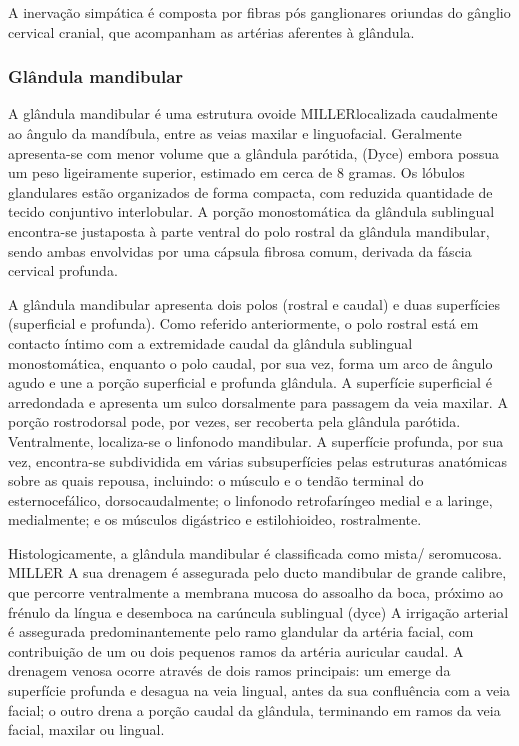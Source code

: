 A inervação simpática é composta por fibras pós ganglionares oriundas do gânglio cervical cranial, que acompanham as artérias aferentes à glândula.\cite{dyce}

\subsubsection{Glândula mandibular}

A glândula mandibular é uma estrutura ovoide MILLER\cite{dyce}localizada caudalmente ao ângulo da mandíbula, entre as veias maxilar e linguofacial. Geralmente apresenta-se com menor volume que a glândula parótida, (Dyce) embora possua um peso ligeiramente superior, estimado em cerca de 8 gramas. Os lóbulos glandulares estão organizados de forma compacta, com reduzida quantidade de tecido conjuntivo interlobular. A porção monostomática da glândula sublingual encontra-se justaposta à parte ventral do polo rostral da glândula mandibular, sendo ambas envolvidas por uma cápsula fibrosa comum, derivada da fáscia cervical profunda.


A glândula mandibular apresenta dois polos (rostral e caudal) e duas superfícies (superficial e profunda). Como referido anteriormente, o polo rostral está em contacto íntimo com a extremidade caudal da glândula sublingual monostomática, enquanto o polo caudal, por sua vez, forma um arco de ângulo agudo e une a porção superficial e profunda glândula. A superfície superficial é arredondada e apresenta um sulco dorsalmente para passagem da veia maxilar. A porção rostrodorsal pode, por vezes, ser recoberta pela glândula parótida. Ventralmente, localiza-se o linfonodo mandibular. A superfície profunda, por sua vez, encontra-se subdividida em várias subsuperfícies pelas estruturas anatómicas sobre as quais repousa, incluindo: o músculo e o tendão terminal do esternocefálico, dorsocaudalmente; o linfonodo retrofaríngeo medial e a laringe, medialmente; e os músculos digástrico e estilohioideo, rostralmente.


Histologicamente, a glândula mandibular é classificada como mista/ seromucosa. MILLER \cite{dyce}
A sua drenagem é assegurada pelo ducto mandibular de grande calibre, que percorre ventralmente a membrana mucosa do assoalho  da boca, próximo ao frénulo da língua e desemboca na carúncula sublingual (dyce)
A irrigação arterial é assegurada predominantemente pelo ramo glandular da artéria facial, com contribuição de um ou dois pequenos ramos da artéria auricular caudal. A drenagem venosa ocorre através de dois ramos principais: um emerge da superfície profunda e desagua na veia lingual, antes da sua confluência com a veia facial; o outro drena a porção caudal da glândula, terminando em ramos da veia facial, maxilar ou lingual.



